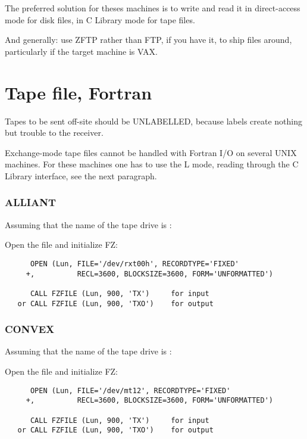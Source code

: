 The preferred solution for theses machines is to write and read it
in direct-access mode for disk files,
in C Library mode for tape files.

And generally: use ZFTP rather than FTP, if you have it,
to ship files around, particularly if the target machine is VAX.

\section{Tape file, Fortran}

Tapes to be sent off-site should be UNLABELLED,
because labels create nothing but trouble to the receiver.

Exchange-mode tape files cannot be handled with Fortran I/O
on several UNIX machines.
For these machines one has to use the L mode,
reading through the C Library interface, see the next paragraph.

\subsubsection*{ALLIANT}

Assuming that the name of the tape drive is :

Open the file and initialize FZ:

\begin{verbatim}
      OPEN (Lun, FILE='/dev/rxt00h', RECORDTYPE='FIXED'
     +,          RECL=3600, BLOCKSIZE=3600, FORM='UNFORMATTED')

      CALL FZFILE (Lun, 900, 'TX')     for input
   or CALL FZFILE (Lun, 900, 'TXO')    for output
\end{verbatim}

\subsubsection{CONVEX}

Assuming that the name of the tape drive is :

Open the file and initialize FZ:

\begin{verbatim}
      OPEN (Lun, FILE='/dev/mt12', RECORDTYPE='FIXED'
     +,          RECL=3600, BLOCKSIZE=3600, FORM='UNFORMATTED')

      CALL FZFILE (Lun, 900, 'TX')     for input
   or CALL FZFILE (Lun, 900, 'TXO')    for output
\end{verbatim}

